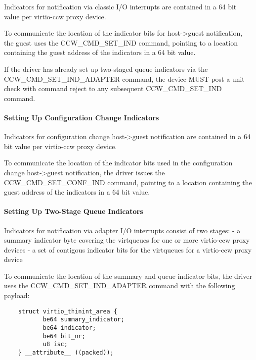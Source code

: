 Indicators for notification via classic I/O interrupts are contained
in a 64 bit value per virtio-ccw proxy device.

To communicate the location of the indicator bits for host->guest
notification, the guest uses the CCW_CMD_SET_IND command,
pointing to a location containing the guest address of the
indicators in a 64 bit value.

If the driver has already set up two-staged queue indicators via the
CCW_CMD_SET_IND_ADAPTER command, the device MUST post a unit check
with command reject to any subsequent CCW_CMD_SET_IND command.

\paragraph{Setting Up Configuration Change Indicators}\label{sec:Virtio Transport Options / Virtio over channel I/O / Device Initialization / Setting Up Indicators / Setting Up Configuration Change Indicators}

Indicators for configuration change host->guest notification are
contained in a 64 bit value per virtio-ccw proxy device.

To communicate the location of the indicator bits used in the
configuration change host->guest notification, the driver issues the
CCW_CMD_SET_CONF_IND command, pointing to a location containing the
guest address of the indicators in a 64 bit value.

\paragraph{Setting Up Two-Stage Queue Indicators}\label{sec:Virtio Transport Options / Virtio over channel I/O / Device Initialization / Setting Up Indicators / Setting Up Two-Stage Queue Indicators}

Indicators for notification via adapter I/O interrupts consist of
two stages:
- a summary indicator byte covering the virtqueues for one or more
  virtio-ccw proxy devices
- a set of contigous indicator bits for the virtqueues for a
  virtio-ccw proxy device

To communicate the location of the summary and queue indicator bits,
the driver uses the CCW_CMD_SET_IND_ADAPTER command with the following
payload:

\begin{lstlisting}
	struct virtio_thinint_area {
	       be64 summary_indicator;
	       be64 indicator;
	       be64 bit_nr;
	       u8 isc;
	} __attribute__ ((packed));
\end{lstlisting}

